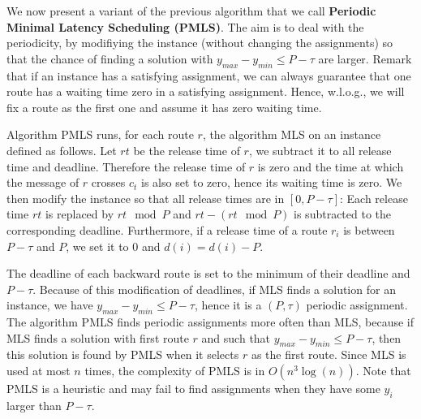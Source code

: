 \documentclass[10pt, conference, letterpaper]{IEEEtran}
\begin{document}
     
     We now present a variant of the previous algorithm that we call {\bf Periodic Minimal Latency Scheduling (PMLS)}. The aim is to deal with the periodicity, by modifiying the instance (without changing the assignments) so that the chance of finding a solution with $y_{max}- y_{min} \leq P -\tau $ are larger.  Remark that if an instance has a satisfying assignment, we can always guarantee that one route has a waiting time zero in a satisfying assignment. Hence, w.l.o.g., we will fix a route as the first one and assume it has zero waiting time.
     
     Algorithm PMLS runs, for each route $r$, the algorithm MLS on an instance defined as follows. 
     Let $rt$ be the release time of $r$, we subtract it to all release time and deadline.
     Therefore the release time of $r$ is zero and the time at which the message of $r$ crosses $c_t$ is also set to zero, hence its waiting time is zero.  We then modify the instance so that all release times are in $[0,P-\tau]$: Each release time $rt$ is replaced by $rt \mod P$ and $rt - (rt \mod P)$ is subtracted to the corresponding deadline. 
     Furthermore, if a release time of a route $r_i$ is between $  P-\tau$ and $P$, we set it to $0$ and $d(i) = d(i) - P$. 
     
     The deadline of each backward route is set to the minimum of their deadline and $P - \tau$. Because of this modification of deadlines, if MLS finds a solution for an instance, we have $y_{max}- y_{min} \leq P -\tau $, hence it is a $(P,\tau)$ periodic assignment.  The algorithm PMLS finds periodic assignments more often than MLS, because if MLS finds a solution with first route $r$ and such that $y_{max} - y_{min} \leq P -\tau$, then this solution is found by PMLS when it selects $r$ as the first route. Since MLS is used at most $n$ times, the complexity of PMLS is in $O(n^3\log(n))$. Note that PMLS is a heuristic and may fail to find assignments when they have some $y_i$ larger than $P - \tau$.
     
%   
%     
% 
%     
% 
% 
\end{document}
